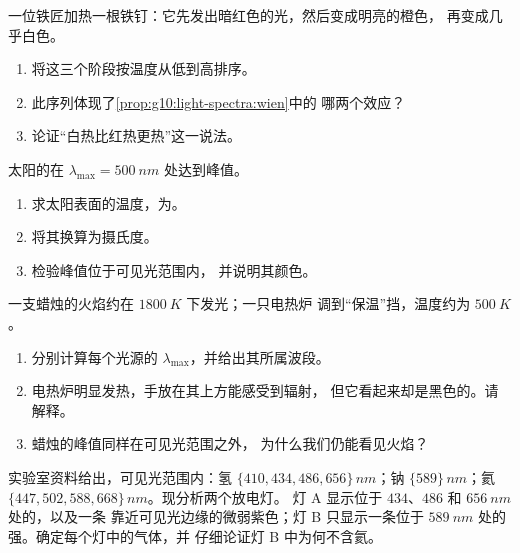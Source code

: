 \begin{exercise}[$\star$]\label{exo:g10:light-spectra:5}
一位铁匠加热一根铁钉：它先发出暗红色的光，然后变成明亮的橙色，
再变成几乎白色。
\begin{enumerate}
  \item 将这三个阶段按温度从低到高排序。
  \item 此序列体现了\cref{prop:g10:light-spectra:wien}中的
        哪两个效应？
  \item 论证“白热比红热更热”这一说法。
\end{enumerate}
\end{exercise}

\begin{exercise}[$\star\star$]\label{exo:g10:light-spectra:6}
太阳的在 $\lambda_{\max} = \qty{500}{nm}$ 处达到峰值。
\begin{enumerate}
  \item 求太阳表面的温度，为。
  \item 将其换算为摄氏度。
  \item 检验峰值位于可见光范围内，
        并说明其颜色。
\end{enumerate}
\end{exercise}

\begin{exercise}[$\star\star$]\label{exo:g10:light-spectra:7}
一支蜡烛的火焰约在 $\qty{1800}{K}$ 下发光；一只电热炉
调到“保温”挡，温度约为 $\qty{500}{K}$。
\begin{enumerate}
  \item 分别计算每个光源的 $\lambda_{\max}$，并给出其所属波段。
  \item 电热炉明显发热，手放在其上方能感受到辐射，
        但它看起来却是黑色的。请解释。
  \item 蜡烛的峰值同样在可见光范围之外，
        为什么我们仍能看见火焰？
\end{enumerate}
\end{exercise}

\begin{exercise}[$\star\star$]\label{exo:g10:light-spectra:8}
实验室资料给出，可见光范围内：氢
$\{410, 434, 486, 656\}\,\unit{nm}$；钠 $\{589\}\,\unit{nm}$；氦
$\{447, 502, 588, 668\}\,\unit{nm}$。现分析两个放电灯。
灯 A 显示位于 $434$、$486$ 和 $\qty{656}{nm}$ 处的，以及一条
靠近可见光边缘的微弱紫色；灯 B 只显示一条位于
$\qty{589}{nm}$ 处的强。确定每个灯中的气体，并
仔细论证灯 B 中为何不含氦。
\end{exercise}

